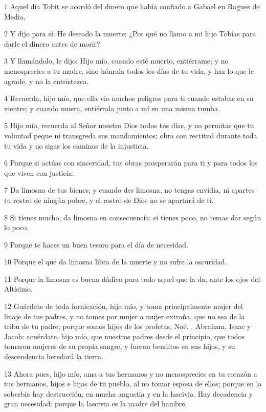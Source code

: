 \par 1 Aquel día Tobit se acordó del dinero que había confiado a Gabael en Ragues de Media,
\par 2 Y dijo para sí: He deseado la muerte; ¿Por qué no llamo a mi hijo Tobías para darle el dinero antes de morir?
\par 3 Y llamándolo, le dijo: Hijo mío, cuando esté muerto, entiérrame; y no menosprecies a tu madre, sino hónrala todos los días de tu vida, y haz lo que le agrade, y no la entristezca.
\par 4 Recuerda, hijo mío, que ella vio muchos peligros para ti cuando estabas en su vientre; y cuando muera, entiérrala junto a mí en una misma tumba.
\par 5 Hijo mío, recuerda al Señor nuestro Dios todos tus días, y no permitas que tu voluntad peque ni transgreda sus mandamientos; obra con rectitud durante toda tu vida y no sigas los caminos de la injusticia.
\par 6 Porque si actúas con sinceridad, tus obras prosperarán para ti y para todos los que viven con justicia.
\par 7 Da limosna de tus bienes; y cuando des limosna, no tengas envidia, ni apartes tu rostro de ningún pobre, y el rostro de Dios no se apartará de ti.
\par 8 Si tienes mucho, da limosna en consecuencia; si tienes poco, no temas dar según lo poco.
\par 9 Porque te haces un buen tesoro para el día de necesidad.
\par 10 Porque el que da limosna libra de la muerte y no sufre la oscuridad.
\par 11 Porque la limosna es buena dádiva para todo aquel que la da, ante los ojos del Altísimo.
\par 12 Guárdate de toda fornicación, hijo mío, y toma principalmente mujer del linaje de tus padres, y no tomes por mujer a mujer extraña, que no sea de la tribu de tu padre; porque somos hijos de los profetas, Noé. , Abraham, Isaac y Jacob: acuérdate, hijo mío, que nuestros padres desde el principio, que todos tomaron mujeres de su propia sangre, y fueron benditos en sus hijos, y su descendencia heredará la tierra.
\par 13 Ahora pues, hijo mío, ama a tus hermanos y no menosprecies en tu corazón a tus hermanos, hijos e hijas de tu pueblo, al no tomar esposa de ellos; porque en la soberbia hay destrucción, en mucha angustia y en la lascivia. Hay decadencia y gran necesidad: porque la lascivia es la madre del hambre.
